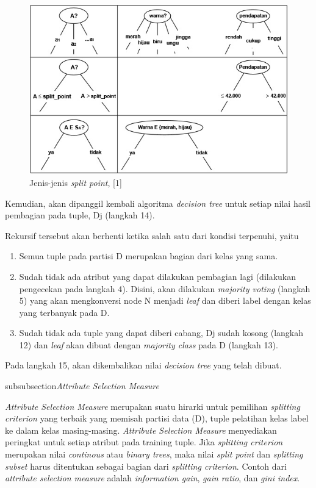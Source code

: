 \begin{figure}
\includegraphics[scale=1]{Gambar/jenishasilsplitpoint.jpg}
\caption[Jenis-jenis \textsl{split point}, [1]{Jenis-jenis \textsl{split point}, [1]} 
\end{figure}

Kemudian, akan dipanggil kembali algoritma \textsl{decision tree} untuk setiap nilai hasil pembagian pada tuple, Dj  (langkah 14).

Rekursif tersebut akan berhenti ketika salah satu dari kondisi terpenuhi, yaitu

\begin{enumerate}
	\item Semua tuple pada partisi D merupakan bagian dari kelas yang sama.
	\item Sudah tidak ada atribut yang dapat dilakukan pembagian lagi (dilakukan pengecekan pada langkah 4). Disini, akan dilakukan \textsl{majority voting} (langkah 5) yang akan mengkonversi node N menjadi \textsl{leaf} dan diberi label dengan kelas yang terbanyak pada D.
	\item Sudah tidak ada tuple yang dapat diberi cabang, Dj sudah kosong (langkah 12) dan \textsl{leaf} akan dibuat dengan \textsl{majority class} pada D (langkah 13).
\end{enumerate}

Pada langkah 15, akan dikembalikan nilai \textsl{decision tree} yang telah dibuat.

subsubsection{\textsl{Attribute Selection Measure}}

\textsl{Attribute Selection Measure} merupakan suatu hirarki untuk pemilihan \textsl{splitting criterion} yang terbaik yang memisah partisi data (D), tuple pelatihan kelas label ke dalam kelas masing-masing. \textsl{Attribute Selection Measure} menyediakan peringkat untuk setiap atribut pada training tuple. Jika \textsl{splitting criterion} merupakan nilai \textsl{continous} atau \textsl{binary trees}, maka nilai \textsl{split point} dan \textsl{splitting subset} harus ditentukan sebagai bagian dari \textsl{splitting criterion}. Contoh dari \textsl{attribute selection measure} adalah \textsl{information gain}, \textsl{gain ratio}, dan \textsl{gini index}.

